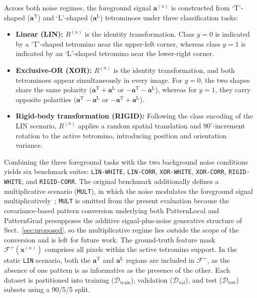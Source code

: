 \documentclass[pdflatex,sn-mathphys-num]{sn-jnl}
\theoremstyle{thmstyleone}
\theoremstyle{thmstyletwo}%
\theoremstyle{thmstylethree}%
\begin{document}
Across both noise regimes, the foreground signal $\mathbf{a}^{(n)}$ is constructed from `T'-shaped ($\mathbf{a}^{\text{T}}$) and `L'-shaped ($\mathbf{a}^{\text{L}}$) tetrominoes under three classification tasks:
\begin{itemize}
    \item \textbf{Linear (LIN):} $R^{(n)}$ is the identity transformation. Class $y = 0$ is indicated by a `T'-shaped tetromino near the upper-left corner, whereas class $y = 1$ is indicated by an `L'-shaped tetromino near the lower-right corner.
    \item \textbf{Exclusive-OR (XOR):} $R^{(n)}$ is the identity transformation, and both tetrominoes appear simultaneously in every image. For $y = 0$, the two shapes share the same polarity ($\mathbf{a}^{\text{T}} + \mathbf{a}^{\text{L}}$ or $-\mathbf{a}^{\text{T}} - \mathbf{a}^{\text{L}}$), whereas for $y = 1$, they carry opposite polarities ($\mathbf{a}^{\text{T}} - \mathbf{a}^{\text{L}}$ or $-\mathbf{a}^{\text{T}} + \mathbf{a}^{\text{L}}$).
    \item \textbf{Rigid-body transformation (RIGID):} Following the class encoding of the LIN scenario, $R^{(n)}$ applies a random spatial translation and $90^\circ$-increment rotation to the active tetromino, introducing position and orientation variance.
\end{itemize}

Combining the three foreground tasks with the two background noise conditions yields six benchmark suites: \texttt{LIN-WHITE}, \texttt{LIN-CORR}, \texttt{XOR-WHITE}, \texttt{XOR-CORR}, \texttt{RIGID-WHITE}, and \texttt{RIGID-CORR}. The original benchmark additionally defines a multiplicative scenario (\texttt{MULT}), in which the noise modulates the foreground signal multiplicatively~\cite{clark2024}; \texttt{MULT} is omitted from the present evaluation because the covariance-based pattern conversion underlying both PatternLocal and PatternGrad presupposes the additive signal-plus-noise generative structure of Sect.~\ref{sec:proposed}, so the multiplicative regime lies outside the scope of the conversion and is left for future work. The ground-truth feature mask $\mathcal{F}^{+}(\mathbf{x}^{(n)})$ comprises all pixels within the active tetromino support. In the static \texttt{LIN} scenario, both the $\mathbf{a}^{\text{T}}$ and $\mathbf{a}^{\text{L}}$ regions are included in $\mathcal{F}^{+}$, as the absence of one pattern is as informative as the presence of the other. Each dataset is partitioned into training ($\mathcal{D}_{\text{train}}$), validation ($\mathcal{D}_{\text{val}}$), and test ($\mathcal{D}_{\text{test}}$) subsets using a 90/5/5 split.
\end{document}
